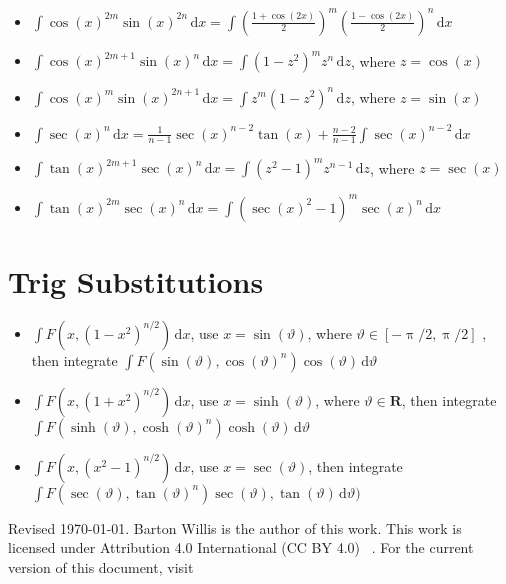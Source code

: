 \documentclass[letterpaper,9pt,fleqn]{extarticle}
\newcommand{\reals}{\mathbf{R}}
\begin{document}
\begin{multicols*}{2}
\begin{itemize}[noitemsep]
  \item $\int \cos(x)^{2m} \sin(x)^{2n} \, \mathrm{d}x
         = \int \left(\frac{1+\cos(2 x)}{2}\right)^m 
                 \left(\frac{1-\cos(2 x)}{2}\right)^n 
                 \, \mathrm{d}x$

  \item $\int \cos(x)^{2m+1} \sin(x)^{n} \, \mathrm{d}x
  = \int (1-z^2)^m  z^{n}
             \, \mathrm{d}z$,  where $z = \cos(x)$

  \item $\int \cos(x)^{m} \sin(x)^{2n+1} \, \mathrm{d}x
             = \int z^m (1-z^2)^n \, \mathrm{d}z$,  
             where $z = \sin(x)$

\item $\int \sec(x)^n \, \mathrm{d} x = \frac{1}{n-1} \sec(x)^{n-2} \tan(x) + \frac{n-2}{n-1} \int \sec(x)^{n-2} \, \mathrm{d} x$

\item $\int \tan(x)^{2m+1} \sec(x)^n \, \mathrm{d} x =  \int (z^2-1)^m z^{n-1} \, \mathrm{d} z$,
where $z=\sec(x)$

\item $\int \tan(x)^{2m} \sec(x)^n \, \mathrm{d} x  = \int (\sec(x)^2-1)^m \sec(x)^n \, \mathrm{d} x$

\end{itemize}                
\section*{Trig Substitutions}

\begin{itemize}[noitemsep]
\item $\int F \left(x, \left(1-x^2\right)^{n/2}\right) \, \mathrm{d} x$, 
use $x = \sin(\vartheta)$, where  $\vartheta \in [-\uppi/2, \uppi/2]$
, then integrate $\int F \left(\sin(\vartheta),\cos(\vartheta)^n\right) \cos(\vartheta) \, \mathrm{d} \vartheta$
\item  $\int F\left(x, \left (1+x^2 \right)^{n/2}\right) \, 
\mathrm{d} x$, use $x = \sinh(\vartheta)$,
where $\vartheta \in \reals$, then integrate
$\int F\left(\sinh(\vartheta), \cosh(\vartheta)^n \right)  \cosh(\vartheta)\, \mathrm{d} \vartheta$

\item  $\int F \left(x, \left(x^2-1\right)^{n/2} \right) \, \mathrm{d} x$, 
use $x = \sec(\vartheta)$, then  integrate \\
$\int F(\sec(\vartheta), \tan(\vartheta)^n) \sec(\vartheta), \tan(\vartheta) 
\, \mathrm{d} \vartheta)$
\end{itemize}

\vfill

\noindent Revised \today. Barton Willis is the author of this work. This work is
licensed under Attribution 4.0 International (CC BY 4.0) \,  . For the current version of
this document, visit \,  

\end{multicols*}
\end{document}
